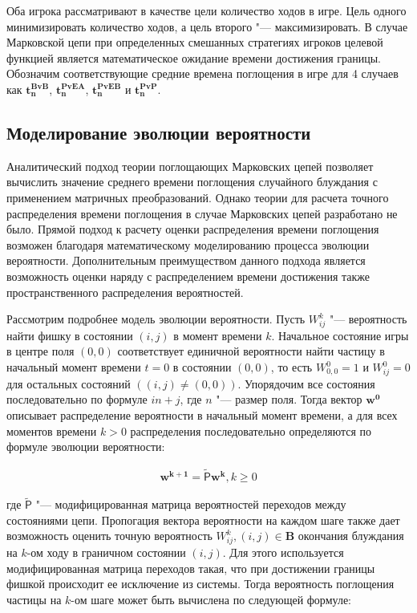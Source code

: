 Оба игрока рассматривают в качестве цели количество ходов в игре. Цель одного минимизировать количество ходов, а цель второго "--- максимизировать.
В случае Марковской цепи при определенных смешанных стратегиях игроков целевой функцией является математическое ожидание времени достижения границы.
Обозначим соответствующие средние времена поглощения в игре для 4 случаев как $\boldsymbol{t_n^{BvB}}$, $\boldsymbol{t_n^{PvEA}}$, $\boldsymbol{t_n^{PvEB}}$ и $\boldsymbol{t_n^{PvP}}$.

\subsection{Моделирование эволюции вероятности}\label{subsec:ch1/sec3/sub3}

Аналитический подход теории поглощающих Марковских цепей позволяет вычислить значение среднего времени поглощения случайного блуждания
с применением матричных преобразований. Однако теории для расчета точного распределения времени поглощения в случае Марковских цепей
разработано не было. Прямой подход к расчету оценки распределения времени поглощения возможен благодаря математическому моделированию процесса 
эволюции вероятности. Дополнительным преимуществом данного подхода является возможность оценки наряду с распределением времени достижения также 
пространственного распределения вероятностей. 

Рассмотрим подробнее модель эволюции вероятности. Пусть $W_{ij}^{k}$ "--- вероятность найти фишку в состоянии $(i, j)$ в момент времени $k$.
Начальное состояние игры в центре поля $(0, 0)$ соответствует единичной вероятности найти частицу в начальный момент времени $t=0$ в состоянии $(0, 0)$,
то есть $W_{0,0}^{0}=1$ и $W_{ij}^{0}=0$ для остальных состояний $((i, j) \neq (0, 0))$. Упорядочим все состояния последовательно по формуле $in + j$, где $n$ "--- размер поля.
Тогда вектор $\boldsymbol{w^{0}}$ описывает распределение вероятности в начальный момент времени, а для всех моментов времени $k > 0$ 
распределения последовательно определяются по формуле эволюции вероятности:

\begin{equation}
    \begin{aligned}
    \boldsymbol{w^{k+1}}=\mathsf{\widetilde{P}}\boldsymbol{w^{k}}, k \geq 0
    \label{eq:evolution}
    \end{aligned}
\end{equation}

где $\mathsf{\widetilde{P}}$ "--- модифицированная матрица вероятностей переходов между состояниями цепи. 
Пропогация вектора вероятности на каждом шаге также дает возможность оценить точную вероятность $W_{ij}^{k}, (i, j) \in \boldsymbol{B}$ окончания блуждания на $k$-ом ходу
в граничном состоянии $(i, j)$. Для этого используется модифицированная матрица переходов такая, что при достижении границы фишкой 
происходит ее исключение из системы. Тогда вероятность поглощения частицы на $k$-ом шаге может быть вычислена по следующей формуле:

